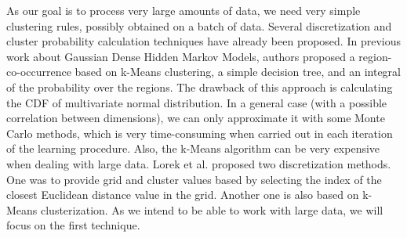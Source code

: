 \documentclass[shortabstract]{iithesis}
\DeclareMathOperator*{\argmin}{arg\,min}
\begin{document}



As our goal is to process very large amounts of data, we need very simple clustering rules, possibly obtained on a batch of data. Several discretization and cluster probability calculation techniques have already been proposed. In previous work about Gaussian Dense Hidden Markov Models, authors proposed a region-co-occurrence based on k-Means clustering, a simple decision tree, and an integral of the probability over the regions. The drawback of this approach is calculating the CDF of multivariate normal distribution. In a general case (with a possible correlation between dimensions),  we can only approximate it with some Monte Carlo methods, which is very time-consuming when carried out in each iteration of the learning procedure. Also, the k-Means algorithm can be very expensive when dealing with large data. 
Lorek et al. proposed two discretization methods. One was to provide grid and cluster values based by selecting the index of the closest Euclidean distance value in the grid. Another one is also based on k-Means clusterization.  As we intend to be able to work with large data, we will focus on the first technique. %


\end{document}
